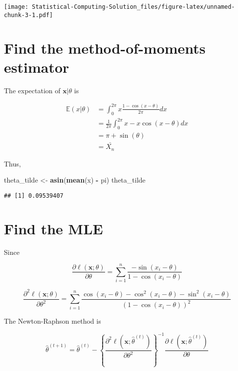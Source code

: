 \documentclass[]{book}
\newenvironment{Shaded}{\begin{snugshade}}{\end{snugshade}}
\newcommand{\KeywordTok}[1]{\textcolor[rgb]{0.13,0.29,0.53}{\textbf{#1}}}
\newcommand{\StringTok}[1]{\textcolor[rgb]{0.31,0.60,0.02}{#1}}
\newcommand{\OperatorTok}[1]{\textcolor[rgb]{0.81,0.36,0.00}{\textbf{#1}}}
\newcommand{\NormalTok}[1]{#1}
\theoremstyle{definition}
\theoremstyle{definition}
\theoremstyle{definition}
\theoremstyle{remark}
\begin{document}
\texttt{[image: Statistical-Computing-Solution\_files/figure-latex/unnamed-chunk-3-1.pdf]}

\section{Find the method-of-moments
estimator}\label{find-the-method-of-moments-estimator}

The expectation of \(\mathbf{x}|\theta\) is

\begin{align*}
\mathbb E (x | \theta) &= \int_{0}^{2\pi} x \frac{1-\cos(x-\theta)}{2\pi} dx \\
&= \frac{1}{2\pi} \int_{0}^{2\pi} x - x\cos(x-\theta) dx \\
&= \pi + \sin(\theta) \\
&= \bar{X_n}
\end{align*}

Thus,

\begin{Shaded}
\begin{Highlighting}[]
\NormalTok{theta_tilde <-}\StringTok{ }\KeywordTok{asin}\NormalTok{(}\KeywordTok{mean}\NormalTok{(x) }\OperatorTok{-}\StringTok{ }\NormalTok{pi)}
\NormalTok{theta_tilde}
\end{Highlighting}
\end{Shaded}

\begin{verbatim}
## [1] 0.09539407
\end{verbatim}

\section{Find the MLE}\label{find-the-mle}

Since

\[\frac{\partial\ell(\mathbf{x}; \theta)}{\partial\theta} = \sum_{i=1}^n \frac{-\sin(x_i - \theta)}{1-\cos(x_i-\theta)}\]

\[\frac{\partial^2\ell(\mathbf{x}; \theta)}{\partial \theta^2} = \sum_{i=1}^n \frac{\cos(x_i-\theta) - \cos^2(x_i-\theta)-\sin^2(x_i-\theta)}{(1-\cos(x_i-\theta))^2}\]

The Newton-Raphson method is

\[\hat\theta^{(t+1)} = \hat\theta^{(t)} - \left\{\frac{\partial^2\ell(\mathbf{x}; \hat\theta^{(t)})}{\partial \theta^2}\right\}^{-1}\frac{\partial\ell(\mathbf{x}; \hat\theta^{(t)})}{\partial\theta}\]
\end{document}

